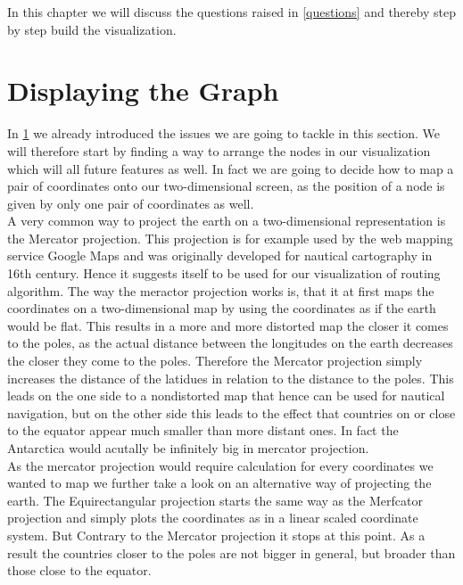 \documentclass
[
	paper = a4,
    pagesize,
	12 pt,
	oneside,                       %
    open = right,
	DIV = calc,
	BCOR = 0 mm,                   %
	bibtotoc
]
{scrbook}
\begin{document}
In this chapter we will discuss the questions raised in \cref{questions} and thereby step by step build the visualization.


\section{Displaying the Graph} \label{graph}

In \cref{graph} we already introduced the issues we are going to tackle in this section.
We will therefore start by finding a way to arrange the nodes in our visualization which will all future features as well.
In fact we are going to decide how to map a pair of coordinates onto our two-dimensional screen, as the position of a node is given by only one pair of coordinates as well.\\

A very common way to project the earth on a two-dimensional representation is the Mercator projection.
This projection is for example used by the web mapping service Google Maps and was originally developed for nautical cartography in 16th century.
Hence it suggests itself to be used for our visualization of routing algorithm.
The way the meractor projection works is, that it at first maps the coordinates on a two-dimensional map by using the coordinates as if the earth would be flat.
This results in a more and more distorted map the closer it comes to the poles, as the actual distance between the longitudes on the earth decreases the closer they come to the poles.
Therefore the Mercator projection simply increases the distance of the latidues in relation to the distance to the poles.
This leads on the one side to a nondistorted map that hence can be used for nautical navigation, but on the other side this leads to the effect that countries on or close to the equator appear much smaller than more distant ones.
In fact the Antarctica would acutally be infinitely big in mercator projection.\\

As the mercator projection would require calculation for every coordinates we wanted to map we further take a look on an alternative way of projecting the earth.
The Equirectangular projection starts the same way as the Merfcator projection and simply plots the coordinates as in a linear scaled coordinate system.
But Contrary to the Mercator projection it stops at this point.
As a result the countries closer to the poles are not bigger in general, but broader than those close to the equator.
\end{document}
